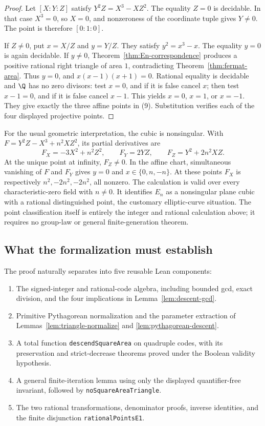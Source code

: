 \begin{proof}
Let $[X:Y:Z]$ satisfy $Y^2Z=X^3-XZ^2$.
The equality $Z=0$ is decidable.  In that case $X^3=0$, so $X=0$, and
nonzeroness of the coordinate tuple gives $Y\ne0$.  The point is therefore
$[0:1:0]$.

If $Z\ne0$, put $x=X/Z$ and $y=Y/Z$.  They satisfy
$y^2=x^3-x$.  The equality $y=0$ is again decidable.  If $y\ne0$,
Theorem~\ref{thm:En-correspondence} produces a positive rational right
triangle of area $1$, contradicting Theorem~\ref{thm:fermat-area}.
Thus $y=0$, and $x(x-1)(x+1)=0$.  Rational equality is decidable and
$\Q$ has no zero divisors: test $x=0$, and if it is false cancel $x$;
then test $x-1=0$, and if it is false cancel $x-1$.  This yields
$x=0$, $x=1$, or $x=-1$.  They give exactly the three affine points in
(9).  Substitution verifies each of the four displayed projective points.
\end{proof}

For the usual geometric interpretation, the cubic is nonsingular.  With
$F=Y^2Z-X^3+n^2XZ^2$, its partial derivatives are
\[
 F_X=-3X^2+n^2Z^2,\qquad F_Y=2YZ,\qquad
 F_Z=Y^2+2n^2XZ.
\]
At the unique point at infinity, $F_Z\ne0$.  In the affine chart, simultaneous
vanishing of $F$ and $F_Y$ gives $y=0$ and $x\in\{0,n,-n\}$.
At these points $F_X$ is respectively $n^2,-2n^2,-2n^2$, all nonzero.
The calculation is valid over every characteristic-zero field with $n\ne0$.
It identifies $E_n$ as a nonsingular plane cubic with a rational distinguished
point, the customary elliptic-curve situation.  The point classification
itself is entirely the integer and rational calculation above; it requires
no group-law or general finite-generation theorem.

\subsection{What the formalization must establish}

The proof naturally separates into five reusable Lean components:
\begin{enumerate}
\item The signed-integer and rational-code algebra, including bounded gcd,
exact division, and the four implications in
Lemma~\ref{lem:descent-gcd}.
\item Primitive Pythagorean normalization and the parameter extraction
of Lemmas~\ref{lem:triangle-normalize} and
\ref{lem:pythagorean-descent}.
\item A total function \texttt{descendSquareArea} on quadruple codes, with
its preservation and strict-decrease theorems proved under the Boolean
validity hypothesis.
\item A general finite-iteration lemma using only the displayed
quantifier-free invariant, followed by
\texttt{noSquareAreaTriangle}.
\item The two rational transformations, denominator proofs, inverse
identities, and the finite disjunction \texttt{rationalPointsE1}.
\end{enumerate}

